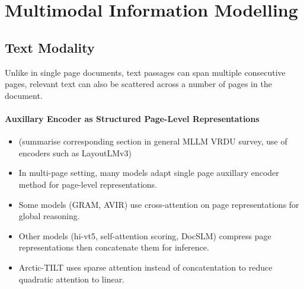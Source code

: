 \documentclass[11pt]{article}
\begin{document}

\section{Multimodal Information Modelling}

\subsection{Text Modality}
Unlike in single page documents, text passages can span multiple consecutive pages, relevant text can also be scattered across a number of pages in the document.

\paragraph{Auxillary Encoder as Structured Page-Level Representations}
\begin{itemize}
    \item (summarise corresponding section in general MLLM VRDU survey, use of encoders such as LayoutLMv3) 
    \item In multi-page setting, many models adapt single page auxillary encoder method for page-level representations. 
    \item Some models (GRAM, AVIR) use cross-attention on page representations for global reasoning. 
    \item Other models (hi-vt5, self-attention scoring, DocSLM) compress page representations then concatenate them for inference.
    \item Arctic-TILT uses sparse attention instead of concatentation to reduce quadratic attention to linear.
\end{itemize}
\end{document}

